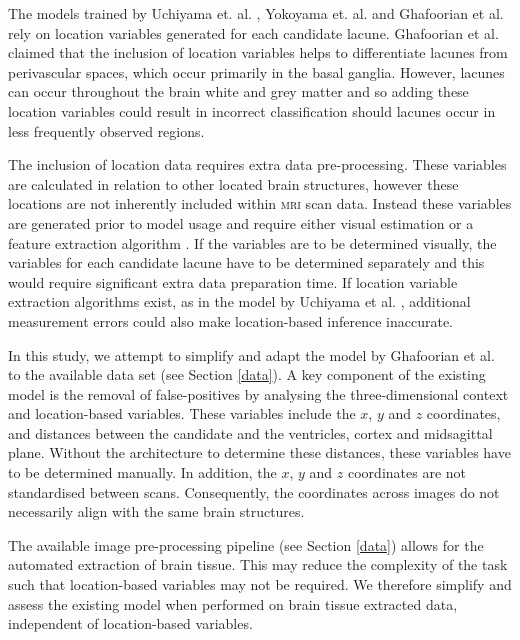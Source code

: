 The models trained by Uchiyama et. al. \cite{UchiyamaYoshikazu2007Ioad}, Yokoyama et. al. \cite{Yokoyama2007} and Ghafoorian et al. \cite{GhafoorianM.2017Dml3} rely on location variables generated for each candidate lacune. Ghafoorian et al. claimed that the inclusion of location variables helps to differentiate lacunes from perivascular spaces, which occur primarily in the basal ganglia. However, lacunes can occur throughout the brain white and grey matter \cite{WardlawJm2013Mosc} and so adding these location variables could result in incorrect classification should lacunes occur in less frequently observed regions.

The inclusion of location data requires extra data pre-processing. These variables are calculated in relation to other located brain structures, however these locations are not inherently included within \textsc{mri} scan data. Instead these variables are generated prior to model usage and require either visual estimation or a feature extraction algorithm \cite{Uchiyama2007b, UchiyamaYoshikazu2007Ioad}. If the variables are to be determined visually, the variables for each candidate lacune have to be determined separately and this would require significant extra data preparation time. If location variable extraction algorithms exist, as in the model by Uchiyama et al. \cite{UchiyamaYoshikazu2007Ioad}, additional measurement errors could also make location-based inference inaccurate.

In this study, we attempt to simplify and adapt the model by Ghafoorian et al. \cite{GhafoorianM.2017Dml3} to the available data set (see Section \ref{data}). A key component of the existing model is the removal of false-positives by analysing the three-dimensional context and location-based variables. These variables include the $x$, $y$ and $z$ coordinates, and distances between the candidate and the ventricles, cortex and midsagittal plane. Without the architecture to determine these distances, these variables have to be determined manually. In addition, the  $x$, $y$ and $z$ coordinates are not standardised between scans. Consequently, the coordinates across images do not necessarily align with the same brain structures.

The available image pre-processing pipeline (see Section \ref{data}) allows for the automated extraction of brain tissue. This may reduce the complexity of the task such that location-based variables may not be required. We therefore simplify and assess the existing model when performed on brain tissue extracted data, independent of location-based variables.


